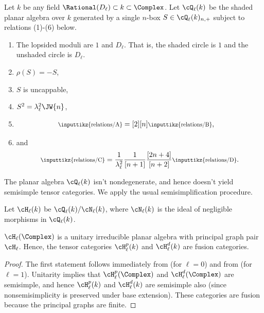 \begin{defn} \label{def:pa}
Let $k$ be any field $\Rational(D_\ell) \subset k \subset \Complex$.  Let $\cQ_\ell(k)$ be the shaded planar algebra over $k$ generated by a single $n$-box $S \in \cQ_\ell(k)_{n,+}$ subject to relations (1)-(6) below.
\begin{enumerate}
\item The lopsided moduli are $1$ and $D_\ell$.  That is, the shaded circle is $1$ and the unshaded circle is $D_\ell$.
\item $\rho(S)=-S$,
\item $S$ is uncappable,
\item $S^2 = \lambda_\ell^2 \JW{n}$,
\item \begin{align*}
	\scalebox{0.8}{\inputtikz{relations/A}}
	        & =  [2] [n]
	\scalebox{0.8}{\inputtikz{relations/B}},
	\end{align*}
\item and
	\begin{align*}
	\scalebox{0.8}{\inputtikz{relations/C}} 
	         = \frac{1}{\lambda_\ell^2} \frac{1}{[n+1]} \frac{[2n+4]}{[n+2]}
        \scalebox{0.8}{\inputtikz{relations/D}}.
	\end{align*}
\end{enumerate}
\end{defn}

The planar algebra $\cQ_\ell(k)$ isn't nondegenerate, and hence doesn't yield semisimple tensor categories.  We apply the usual semisimplification procedure.

\begin{defn}
Let $\cH_\ell(k)$ be $\cQ_\ell(k) / \cN_\ell(k)$, where $\cN_\ell(k)$ is the ideal of negligible morphisms in $\cQ_\ell(k)$.
\end{defn}

\begin{thm}
$\cH_\ell(\Complex)$ is a unitary irreducible planar algebra with principal graph pair $\cH_\ell$.  Hence, the tensor categories $\cH_\ell^p(k)$ and $\cH_\ell^d(k)$ are fusion categories.
\end{thm}
\begin{proof}
The first statement follows immediately from \cite[Theorem 5.5]{0902.1294} (for $\ell=0$) and from \cite[Theorem 3.10]{0909.4099} (for $\ell=1$).  Unitarity implies that $\cH_\ell^p(\Complex)$ and $\cH_\ell^d(\Complex)$ are semisimple, and hence $\cH_\ell^p(k)$ and $\cH_\ell^d(k)$ are semisimple also (since nonsemisimplicity is preserved under base extension).  These categories are fusion because the principal graphs are finite.
\end{proof}

